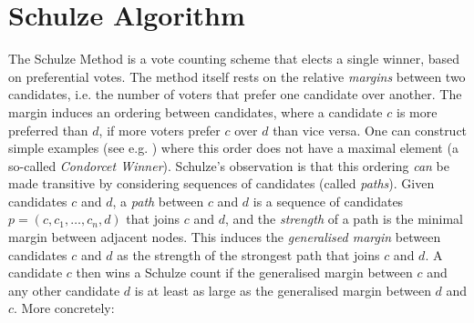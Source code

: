 \section{Schulze Algorithm}
\label{sec:schulze_algorithm}
The Schulze Method \citep{Schulze:2011:NMC} is a vote counting scheme
that elects a single winner, based on preferential votes. 
The method itself rests on the relative 
\emph{margins} between two candidates, i.e. the number of
voters that prefer one candidate over another.  The margin induces
an ordering between candidates, where a candidate $c$ is more
preferred than $d$, if more voters prefer $c$ over $d$ than 
vice versa. One can construct simple examples (see e.g.
\cite{Rivest:2010:OSW}) where this order does not have a maximal
element (a so-called \emph{Condorcet Winner}). Schulze's observation
is that this ordering \emph{can} be made transitive by considering
sequences of candidates (called \emph{paths}). Given candidates $c$
and $d$, a \emph{path} between $c$ and $d$ is a sequence of candidates
 $p = (c, c_1,\dots, c_n, d)$ that joins $c$ and $d$, and 
 the \emph{strength} of a
path is the minimal margin between adjacent nodes. This induces the
\emph{generalised margin} between candidates $c$ and $d$ as the
strength of the strongest path that joins $c$ and $d$. A candidate
$c$ then wins a Schulze count if the generalised margin between $c$
and any other candidate $d$ is at least as large as the generalised
margin between $d$ and $c$. More concretely:

